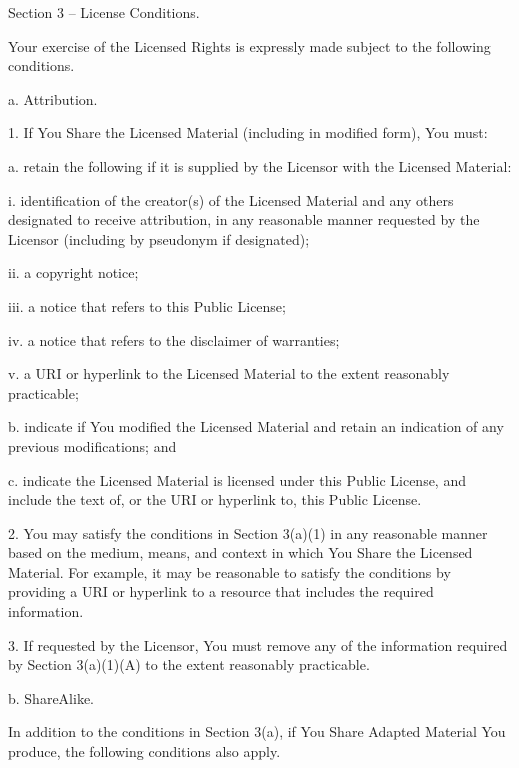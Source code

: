 Section 3 -- License Conditions.

Your exercise of the Licensed Rights is expressly made subject to the
following conditions.

  a. Attribution.

       1. If You Share the Licensed Material (including in modified
          form), You must:

            a. retain the following if it is supplied by the Licensor
               with the Licensed Material:

                 i. identification of the creator(s) of the Licensed
                    Material and any others designated to receive
                    attribution, in any reasonable manner requested by
                    the Licensor (including by pseudonym if
                    designated);

                ii. a copyright notice;

               iii. a notice that refers to this Public License;

                iv. a notice that refers to the disclaimer of
                    warranties;

                 v. a URI or hyperlink to the Licensed Material to the
                    extent reasonably practicable;

            b. indicate if You modified the Licensed Material and
               retain an indication of any previous modifications; and

            c. indicate the Licensed Material is licensed under this
               Public License, and include the text of, or the URI or
               hyperlink to, this Public License.

       2. You may satisfy the conditions in Section 3(a)(1) in any
          reasonable manner based on the medium, means, and context in
          which You Share the Licensed Material. For example, it may be
          reasonable to satisfy the conditions by providing a URI or
          hyperlink to a resource that includes the required
          information.

       3. If requested by the Licensor, You must remove any of the
          information required by Section 3(a)(1)(A) to the extent
          reasonably practicable.

  b. ShareAlike.

     In addition to the conditions in Section 3(a), if You Share
     Adapted Material You produce, the following conditions also apply.

